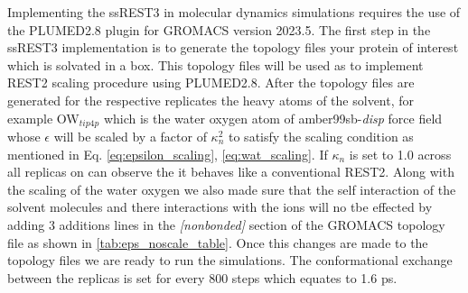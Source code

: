 Implementing the ssREST3 in molecular dynamics simulations requires the use of the PLUMED2.8 plugin for GROMACS version 2023.5. 
The first step in the ssREST3 implementation is to generate the topology files your protein of interest which is solvated in a box. 
This topology files will be used as to implement REST2 scaling procedure using PLUMED2.8. 
After the topology files are generated for the respective replicates the heavy atoms of the solvent, for example OW$_{tip4p}$ which is the water oxygen atom of amber99sb-\textit{disp} force field whose $\epsilon$ will be scaled by a factor of $\kappa^{2}_{n}$ to satisfy the scaling condition as mentioned in Eq. \ref{eq:epsilon_scaling}, \ref{eq:wat_scaling}. 
If $\kappa_{n}$ is set to 1.0 across all replicas on can observe the it behaves like a conventional REST2. 
Along with the scaling of the water oxygen we also made sure that the self interaction of the solvent molecules and there interactions with the ions will no tbe effected by adding 3 additions lines in the \textit{[nonbonded]} section of the GROMACS topology file as shown in \ref{tab:eps_noscale_table}.
Once this changes are made to the topology files we are ready to run the simulations.
The conformational exchange between the replicas is set for every 800 steps which equates to 1.6 ps.    